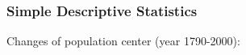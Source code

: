 \documentclass[10pt]{beamer}\usepackage[]{graphicx}\usepackage[]{color}
\newcommand{\bcenter}{\begin{center}}
\newcommand{\ecenter}{\end{center}}
\newcommand{\bblock}{\begin{block}}
\newcommand{\eblock}{\end{block}}
\begin{document}
\begin{frame}
\frametitle{Simple Descriptive Statistics}
\bblock{Changes of population center (year 1790-2000):}
\bcenter
{}
\ecenter
\eblock
\end{frame}
\end{document}
